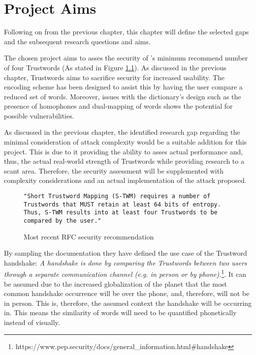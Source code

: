 \chapter{Project Aims}

Following on from the previous chapter, this chapter will define the selected gaps and the subsequent research questions and aims.

The chosen project aims to asses the security of \pep's minimum recommend number of four Trustwords (As stated in Figure \ref{fig:trustwordsNum}). As discussed in the previous chapter, Trustwords aims to sacrifice security for increased usability. The encoding scheme has been designed to assist this by having  the user compare a reduced set of words. Moreover, issues with the dictionary's design such as the presence of homophones and dual-mapping of words shows the potential for possible vulnerabilities. 

As discussed in the previous chapter, the identified research gap regarding the minimal consideration of attack complexity would be a suitable addition for this project. This is due to it providing the ability to asses actual performance and, thus, the actual real-world strength of Trustwords while providing research to a scant area. Therefore, the security assessment will be supplemented with complexity considerations and an actual implementation of the attack proposed.

\begin{figure}[h!]
    \centering
    \begin{verbatim}
"Short Trustword Mapping (S-TWM) requires a number of 
Trustwords that MUST retain at least 64 bits of entropy. 
Thus, S-TWM results into at least four Trustwords to be 
compared by the user."
    \end{verbatim}
    \caption{Most recent RFC security recommendation}
    \label{fig:trustwordsNum}
\end{figure}

By sampling the \pep documentation they have defined the use case of the Trustword handshake: \textit{A handshake is done by comparing the Trustwords between two users through a separate communication channel (e.g. in person or by phone).}\footnote{https://www.pep.security/docs/general\_information.html\#handshake}. It can be assumed due to the increased globalization of the planet that the most common handshake occurrence will be over the phone, and, therefore, will not be in person. This is, therefore, the assumed context the handshake will be occurring in. This means the similarity of words will need to be quantified phonetically instead of visually.

